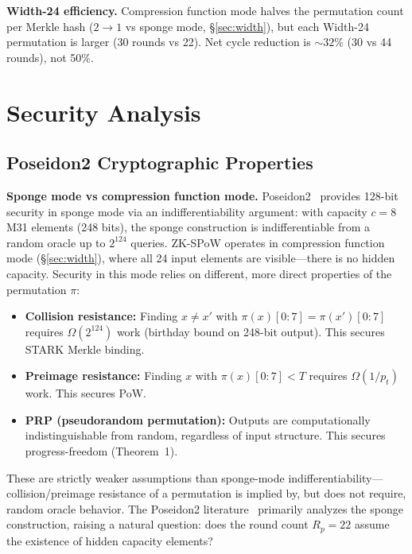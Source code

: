 \documentclass[11pt,a4paper]{article}
\begin{document}
\textbf{Width-24 efficiency.} Compression function mode halves the permutation count per Merkle hash ($2 \to 1$ vs sponge mode, \S\ref{sec:width}), but each Width-24 permutation is larger (30 rounds vs 22). Net cycle reduction is ${\sim}32\%$ (30 vs 44 rounds), not 50\%.

\section{Security Analysis}
\label{sec:security}

\subsection{Poseidon2 Cryptographic Properties}
\label{sec:crypto-props}

\textbf{Sponge mode vs compression function mode.} Poseidon2~\cite{poseidon2} provides 128-bit security in sponge mode via an indifferentiability argument: with capacity $c = 8$ M31 elements (248 bits), the sponge construction is indifferentiable from a random oracle up to $2^{124}$ queries. ZK-SPoW operates in compression function mode (\S\ref{sec:width}), where all 24 input elements are visible---there is no hidden capacity. Security in this mode relies on different, more direct properties of the permutation $\pi$:

\begin{itemize}
\item \textbf{Collision resistance:} Finding $x \neq x'$ with $\pi(x)[0{:}7] = \pi(x')[0{:}7]$ requires $\Omega(2^{124})$ work (birthday bound on 248-bit output). This secures STARK Merkle binding.
\item \textbf{Preimage resistance:} Finding $x$ with $\pi(x)[0{:}7] < T$ requires $\Omega(1/p_t)$ work. This secures PoW.
\item \textbf{PRP (pseudorandom permutation):} Outputs are computationally indistinguishable from random, regardless of input structure. This secures progress-freedom (Theorem~1).
\end{itemize}

These are strictly weaker assumptions than sponge-mode indifferentiability---collision/preimage resistance of a permutation is implied by, but does not require, random oracle behavior. The Poseidon2 literature~\cite{poseidon,poseidon2} primarily analyzes the sponge construction, raising a natural question: does the round count $R_p = 22$ assume the existence of hidden capacity elements?
\end{document}
